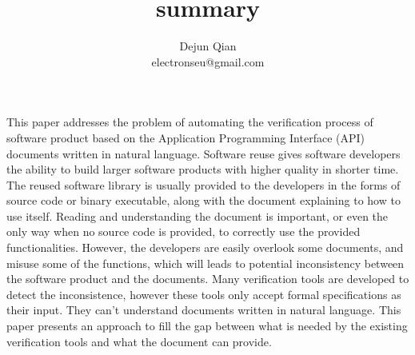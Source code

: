 \documentclass[11pt,letterpaper,oneside]{article}
\title{summary}
\author{Dejun Qian\\electronseu@gmail.com}
\date{}
\begin{document}
\maketitle

This paper \cite{bib:Pandita} addresses the problem of automating the verification process of software product based on the Application Programming Interface (API) documents written in natural language.
Software reuse gives software developers the ability to build larger software products with higher quality in shorter time.
The reused software library is usually provided to the developers in the forms of source code or binary executable,
along with the document explaining to how to use itself.
Reading and understanding the document is important, 
or even the only way when no source code is provided,
to correctly use the provided functionalities.
However, the developers are easily overlook some documents,
and misuse some of the functions,
which will leads to potential inconsistency between the software product and the documents.
Many verification tools are developed to detect the inconsistence,
however these tools only accept formal specifications as their input.
They can't understand documents written in natural language.
This paper presents an approach to fill the gap between what is needed by the existing verification tools and what the document can provide.
\end{document}

